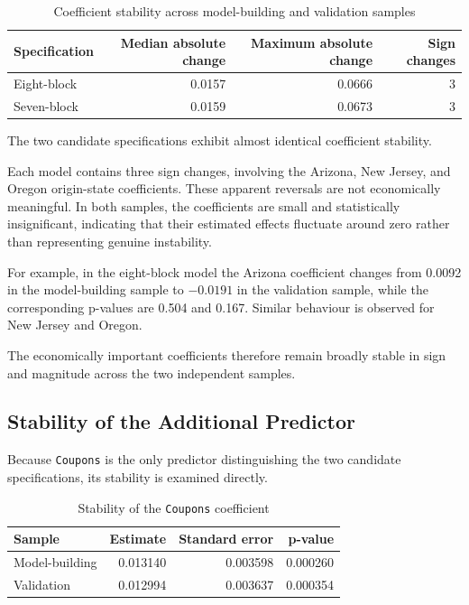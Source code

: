 \documentclass[11pt,a4paper]{article}
\begin{document}
\begin{table}[H]
\centering
\caption{Coefficient stability across model-building and validation samples}
\label{tab:coefficient-stability}
\begin{tabular}{lrrr}
\toprule
\textbf{Specification} & \textbf{Median absolute change} & \textbf{Maximum absolute change} & \textbf{Sign changes} \\
\midrule
Eight-block & 0.0157 & 0.0666 & 3 \\
Seven-block & 0.0159 & 0.0673 & 3 \\
\bottomrule
\end{tabular}
\end{table}

The two candidate specifications exhibit almost identical coefficient stability.

Each model contains three sign changes, involving the Arizona, New Jersey, and Oregon origin-state coefficients. These apparent reversals are not economically meaningful. In both samples, the coefficients are small and statistically insignificant, indicating that their estimated effects fluctuate around zero rather than representing genuine instability.

For example, in the eight-block model the Arizona coefficient changes from 0.0092 in the model-building sample to \(-0.0191\) in the validation sample, while the corresponding p-values are 0.504 and 0.167. Similar behaviour is observed for New Jersey and Oregon.

The economically important coefficients therefore remain broadly stable in sign and magnitude across the two independent samples.

\subsection{Stability of the Additional Predictor}

Because \texttt{Coupons} is the only predictor distinguishing the two candidate specifications, its stability is examined directly.

\begin{table}[H]
\centering
\caption{Stability of the \texttt{Coupons} coefficient}
\label{tab:coupons-validation}
\begin{tabular}{lrrr}
\toprule
\textbf{Sample} & \textbf{Estimate} & \textbf{Standard error} & \textbf{p-value} \\
\midrule
Model-building & 0.013140 & 0.003598 & 0.000260 \\
Validation & 0.012994 & 0.003637 & 0.000354 \\
\bottomrule
\end{tabular}
\end{table}
\end{document}
